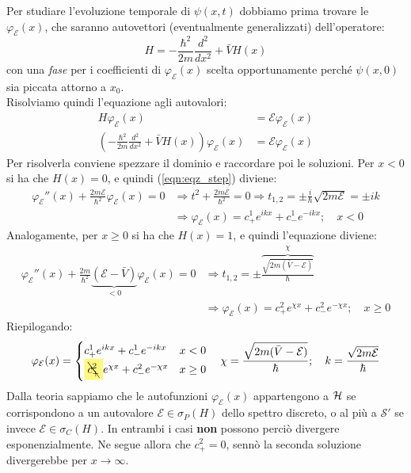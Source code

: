 \documentclass[../../FisicaTeorica.tex]{subfiles}
\begin{document}
Per studiare l'evoluzione temporale di $\psi(x,t)$ dobbiamo prima trovare le $\varphi_\mathcal{E}(x)$, che saranno autovettori (eventualmente generalizzati) dell'operatore:
\[
H=-\frac{\hbar^2}{2m}\frac{d^2}{dx^2}+\bar{V}H(x)
\]
con una \textit{fase} per i coefficienti di $\varphi_\mathcal{E}(x)$ scelta opportunamente perché $\psi(x,0)$ sia piccata attorno a $x_0$.\\

Risolviamo quindi l'equazione agli autovalori:
\begin{align}
H\varphi_\mathcal{E}(x)&=\mathcal{E}\varphi_\mathcal{E}(x)\nonumber \\
\left(-\frac{\hbar^2}{2m} \frac{d^2}{dx^2}+\bar{V}H(x)\right)\varphi_{\mathcal{E}}(x)&=\mathcal{E}\varphi_\mathcal{E}(x)
\label{eqn:eqz_step}
\end{align}
Per risolverla conviene spezzare il dominio e raccordare poi le soluzioni. Per $x<0$ si ha che $H(x)=0$, e quindi (\ref{eqn:eqz_step}) diviene:
\begin{align}
\varphi_{\mathcal{E}}''(x)+\frac{2m\mathcal{E}}{\hbar^2}\varphi_\mathcal{E}(x)=0 &\Rightarrow t^2 + \frac{2m\mathcal{E}}{\hbar^2}=0\Rightarrow t_{1,2}=\pm\frac{i}{\hbar}\sqrt{2m\mathcal{E}}=\pm ik
\nonumber
\\
&\Rightarrow \varphi_{\mathcal{E}}(x)=c_+^1 e^{ikx}+c_-^1 e^{-ikx}; \quad x < 0
\label{eqn:conti_negativi}
\end{align} 
Analogamente, per $x\geq 0$ si ha che $H(x)=1$, e quindi l'equazione diviene:
\begin{align}
\varphi_{\mathcal{E}}''(x)+\frac{2m}{\hbar^2}\underbrace{(\mathcal{E}-\bar{V})}_{<0}\varphi_\mathcal{E}(x)=0 &\Rightarrow t_{1,2}=\pm \overbrace{\frac{\sqrt{2m(\bar{V}-\mathcal{E})}}{\hbar}}^{\chi}
\nonumber
\\
&\Rightarrow \varphi_\mathcal{E}(x)=c^2_+e^{\chi x}+c_-^2e^{-\chi x};\quad x\geq 0
\label{eqn:conti_positivi}
\end{align}
Riepilogando:
\begin{equation}
\varphi_\mathcal{E}(x) = 
\begin{cases}
c^1_+ e^{ikx} + c^1_- e^{-ikx} & x<0\\
\hlc{Yellow}{\bcancel{c^2_+}}e^{\chi x} + c^2_- e^{-\chi x} & x\geq0
\end{cases} \quad \chi=\frac{\sqrt{2m(\bar{V}-\mathcal{E})}}{\hbar};
\quad k=\frac{\sqrt{2m\mathcal{E}}}{\hbar}
\label{eqn:autofunzioni}
\end{equation}
Dalla teoria sappiamo che le autofunzioni $\varphi_\mathcal{E}(x)$ appartengono a $\mathcal{H}$ se corrispondono a un autovalore $\mathcal{E} \in \sigma_P(H)$ dello spettro discreto, o al più a $\mathcal{S}'$ se invece $\mathcal{E}\in\sigma_C(H)$. In entrambi i casi \textbf{non} possono perciò divergere esponenzialmente. Ne segue allora che $c^2_+ = 0$, sennò la seconda soluzione divergerebbe per $x\to\infty$.\\
\end{document}
